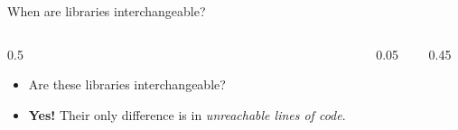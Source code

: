 \ifdefined\PRESENTATION\else\PassOptionsToClass{handout}{beamer}\fi\documentclass[aspectratio=169, lualatex]{beamer}
\begin{document}
\begin{frame}{When are libraries interchangeable?}
	\begin{columns}[c]
		\begin{column}{0.5\textwidth}
			\begin{itemize}[<+->]
				\item Are these libraries interchangeable?
				\item \textbf{Yes!} Their only difference is in \textit{unreachable lines of code}.
			\end{itemize}
		\end{column}
		\begin{column}{0.05\textwidth}
		\end{column}
		\begin{column}{0.45\textwidth}
		\end{column}
	\end{columns}
\end{frame}
\end{document}
